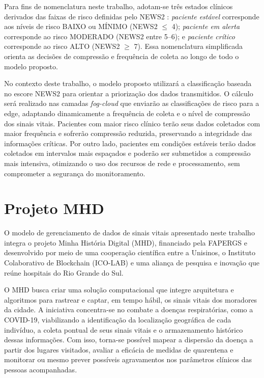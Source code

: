 \documentclass[twoside,english,brazilian]{UNISINOSmonografia}
\begin{document}
Para fins de nomenclatura neste trabalho, adotam-se três estados clínicos derivados das faixas de risco definidas pelo NEWS2 \cite{RoyalCollege2017}: \textit{paciente estável} corresponde aos níveis de risco BAIXO ou MÍNIMO (NEWS2 $\leq$ 4); \textit{paciente em alerta} corresponde ao risco MODERADO (NEWS2 entre 5--6); e \textit{paciente crítico} corresponde ao risco ALTO (NEWS2 $\geq$ 7). Essa nomenclatura simplificada orienta as decisões de compressão e frequência de coleta ao longo de todo o modelo proposto.

No contexto deste trabalho, o modelo proposto utilizará a classificação baseada no escore NEWS2 para orientar a priorização dos dados transmitidos. O cálculo será realizado nas camadas \textit{fog-cloud} que enviarão as classificações de risco para a edge, adaptando dinamicamente a frequência de coleta e o nível de compressão dos sinais vitais. Pacientes com maior risco clínico terão seus dados coletados com maior frequência e sofrerão compressão reduzida, preservando a integridade das informações críticas. Por outro lado, pacientes em condições estáveis terão dados coletados em intervalos mais espaçados e poderão ser submetidos a compressão mais intensiva, otimizando o uso dos recursos de rede e processamento, sem comprometer a segurança do monitoramento.

\section{Projeto MHD}
\label{sec:mhd}

O modelo de gerenciamento de dados de sinais vitais apresentado neste trabalho integra o projeto Minha História Digital (MHD), financiado pela FAPERGS e desenvolvido por meio de uma cooperação científica entre a Unisinos, o Instituto Colaborativo de Blockchain (ICO-LAB) e uma aliança de pesquisa e inovação que reúne hospitais do Rio Grande do Sul.

O MHD busca criar uma solução computacional que integre arquitetura e algoritmos para rastrear e captar, em tempo hábil, os sinais vitais dos moradores da cidade. A iniciativa concentra-se no combate a doenças respiratórias, como a COVID-19, viabilizando a identificação da localização geográfica de cada indivíduo, a coleta pontual de seus sinais vitais e o armazenamento histórico dessas informações. Com isso, torna-se possível mapear a dispersão da doença a partir dos lugares visitados, avaliar a eficácia de medidas de quarentena e monitorar ou mesmo prever possíveis agravamentos nos parâmetros clínicos das pessoas acompanhadas.
\end{document}
